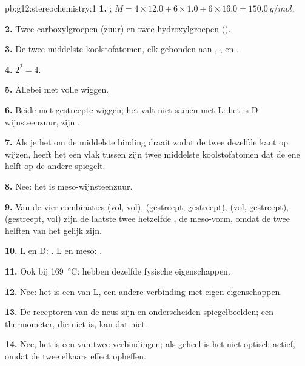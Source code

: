 \begin{solution}{pb:g12:stereochemistry:1}
\textbf{1.} ; $M = 4 \times 12.0 + 6 \times 1.0 + 6 \times 16.0
= \qty{150.0}{g/mol}$.

\textbf{2.} Twee carboxylgroepen (zuur) en twee hydroxylgroepen
().

\textbf{3.} De twee middelste koolstofatomen, elk gebonden aan ,
,  en .

\textbf{4.} $2^2 = 4$.

\textbf{5.} Allebei met volle wiggen.

\textbf{6.} Beide  met gestreepte wiggen; het valt niet samen met
L: het is D-wijnsteenzuur, zijn .

\textbf{7.} Als je het  om de middelste binding draait zodat de
twee  dezelfde kant op wijzen, heeft het een vlak tussen zijn
twee middelste koolstofatomen dat de ene helft op de andere spiegelt.

\textbf{8.} Nee: het is meso-wijnsteenzuur.

\textbf{9.} Van de vier combinaties (vol, vol), (gestreept, gestreept),
(vol, gestreept), (gestreept, vol) zijn de laatste twee hetzelfde
, de meso-vorm, omdat de twee helften van het  gelijk
zijn.

\textbf{10.} L en D: . L en meso: .

\textbf{11.} Ook bij \qty{169}{\celsius}:  hebben dezelfde
fysische eigenschappen.

\textbf{12.} Nee: het is een  van L, een andere verbinding
met eigen eigenschappen.

\textbf{13.} De receptoren van de neus zijn  en onderscheiden
spiegelbeelden; een thermometer, die niet  is, kan dat niet.

\textbf{14.} Nee, het is een  van twee verbindingen; als geheel is
het niet optisch actief, omdat de twee  elkaars effect
opheffen.


\end{solution}
